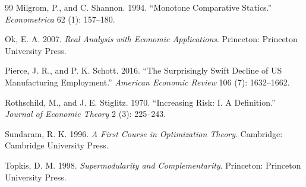 \documentclass[12pt,letterpaper]{article}
\begin{document}
\begin{thebibliography}{99}
Milgrom, P., and C. Shannon. 1994. ``Monotone Comparative Statics.'' \textit{Econometrica} 62 (1): 157--180.

Ok, E. A. 2007. \textit{Real Analysis with Economic Applications}. Princeton: Princeton University Press.

Pierce, J. R., and P. K. Schott. 2016. ``The Surprisingly Swift Decline of US Manufacturing Employment.'' \textit{American Economic Review} 106 (7): 1632--1662.

Rothschild, M., and J. E. Stiglitz. 1970. ``Increasing Risk: I. A Definition.'' \textit{Journal of Economic Theory} 2 (3): 225--243.

Sundaram, R. K. 1996. \textit{A First Course in Optimization Theory}. Cambridge: Cambridge University Press.

Topkis, D. M. 1998. \textit{Supermodularity and Complementarity}. Princeton: Princeton University Press.

\end{thebibliography}
\end{document}
